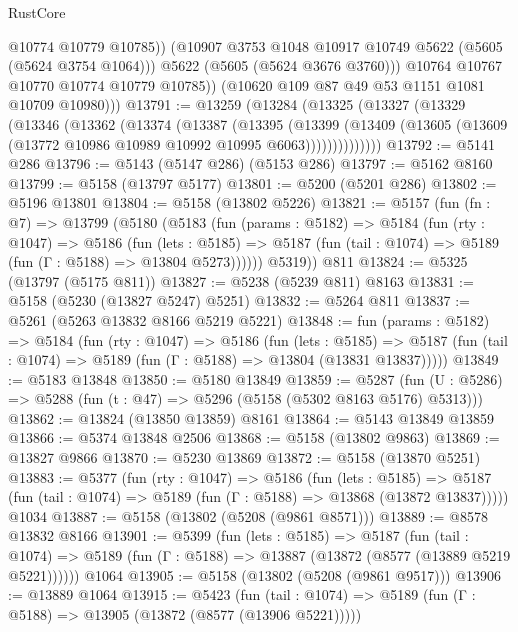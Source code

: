 \begin{lexlean}{RustCore}
\begin{coremodule}
                  @10774
                  @10779
                  @10785))
              (@10907 @3753 @1048 @10917 @10749 @5622 (@5605 (@5624 @3754 @1064)))
              @5622
              (@5605 (@5624 @3676 @3760)))
            @10764
            @10767
            @10770
            @10774
            @10779
            @10785))
        (@10620 @109 @87 @49 @53 @1151 @1081 @10709 @10980)))
@13791 := @13259
    (@13284
      (@13325
        (@13327
          (@13329
            (@13346
              (@13362
                (@13374
                  (@13387
                    (@13395
                      (@13399
                        (@13409
                          (@13605 (@13609 (@13772 @10986 @10989 @10992 @10995 @6063))))))))))))))
@13792 := @5141 @286
@13796 := @5143 (@5147 @286) (@5153 @286)
@13797 := @5162 @8160
@13799 := @5158 (@13797 @5177)
@13801 := @5200 (@5201 @286)
@13802 := @5196 @13801
@13804 := @5158 (@13802 @5226)
@13821 := @5157
    (fun (fn : @7) =>
    @13799
      (@5180
        (@5183
          (fun (params : @5182) =>
          @5184
            (fun (rty : @1047) =>
            @5186
              (fun (lets : @5185) =>
              @5187 (fun (tail : @1074) => @5189 (fun (Γ : @5188) => @13804 @5273))))))
        @5319))
    @811
@13824 := @5325 (@13797 (@5175 @811))
@13827 := @5238 (@5239 @811) @8163
@13831 := @5158 (@5230 (@13827 @5247) @5251)
@13832 := @5264 @811
@13837 := @5261 (@5263 @13832 @8166 @5219 @5221)
@13848 := fun (params : @5182) =>
  @5184
    (fun (rty : @1047) =>
    @5186
      (fun (lets : @5185) =>
      @5187 (fun (tail : @1074) => @5189 (fun (Γ : @5188) => @13804 (@13831 @13837)))))
@13849 := @5183 @13848
@13850 := @5180 @13849
@13859 := @5287
    (fun (U : @5286) => @5288 (fun (t : @47) => @5296 (@5158 (@5302 @8163 @5176) @5313)))
@13862 := @13824 (@13850 @13859) @8161
@13864 := @5143 @13849 @13859
@13866 := @5374 @13848 @2506
@13868 := @5158 (@13802 @9863)
@13869 := @13827 @9866
@13870 := @5230 @13869
@13872 := @5158 (@13870 @5251)
@13883 := @5377
    (fun (rty : @1047) =>
    @5186
      (fun (lets : @5185) =>
      @5187 (fun (tail : @1074) => @5189 (fun (Γ : @5188) => @13868 (@13872 @13837)))))
    @1034
@13887 := @5158 (@13802 (@5208 (@9861 @8571)))
@13889 := @8578 @13832 @8166
@13901 := @5399
    (fun (lets : @5185) =>
    @5187
      (fun (tail : @1074) =>
      @5189 (fun (Γ : @5188) => @13887 (@13872 (@8577 (@13889 @5219 @5221))))))
    @1064
@13905 := @5158 (@13802 (@5208 (@9861 @9517)))
@13906 := @13889 @1064
@13915 := @5423
    (fun (tail : @1074) => @5189 (fun (Γ : @5188) => @13905 (@13872 (@8577 (@13906 @5221)))))

\end{coremodule}
\end{lexlean}
